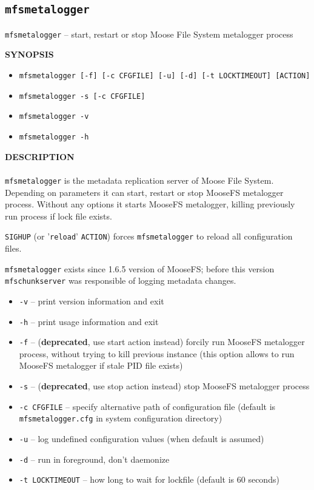 \documentclass[a4paper,11pt,english]{report}
\def\code#1{\texttt{#1}}
\begin{document}
			\subsection{\code{mfsmetalogger}}
				\code{mfsmetalogger} -- start,  restart  or stop Moose File System metalogger process

				\bigskip
				\textbf{SYNOPSIS}
				\begin{itemize}
					\item \code{mfsmetalogger [-f] [-c CFGFILE] [-u] [-d] [-t LOCKTIMEOUT] [ACTION]}
					\item \code{mfsmetalogger -s [-c CFGFILE]}
					\item \code{mfsmetalogger -v}
					\item \code{mfsmetalogger -h}
				\end{itemize}
				
				\bigskip
				\textbf{DESCRIPTION} \\\\
				\code{mfsmetalogger} is the metadata replication server of Moose File  System.
					Depending  on parameters it can start, restart or stop MooseFS metalogger
					process.  Without any options it starts MooseFS metalogger, killing
					previously run process if lock file exists.

					\code{SIGHUP} (or '\code{reload}' \code{ACTION}) forces \code{mfsmetalogger} to reload all configuration files.
					
					\code{mfsmetalogger} exists since 1.6.5 version of MooseFS; before  this  version
					\code{mfschunkserver} was responsible of logging metadata changes.
					
				\begin{itemize}	
					\item \code{-v} -- print version information and exit
					\item \code{-h} -- print usage information and exit
					\item \code{-f} -- (\textbf{deprecated}, use start action instead) forcily run MooseFS
						metalogger process, without trying to kill previous  instance (this
						option allows to run MooseFS  metalogger  if  stale PID file
						exists)
					\item \code{-s} -- (\textbf{deprecated}, use stop action instead)  stop  MooseFS  metalogger process

					\item \code{-c CFGFILE} -- specify  alternative path of configuration file (default is \code{mfsmetalogger.cfg} in system configuration directory)
					\item \code{-u} -- log undefined configuration values (when default is assumed)
					\item \code{-d} -- run in foreground, don't daemonize
					\item \code{-t LOCKTIMEOUT} -- how long to wait for lockfile (default is 60 seconds)
				\end{itemize}
				\bigskip
				
\end{document}
